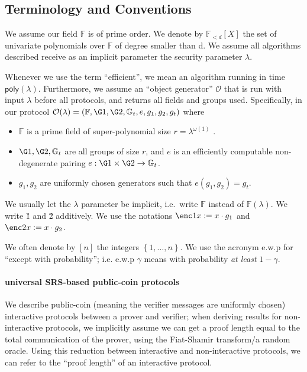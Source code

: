 \documentclass[11pt]{article} %
\newcommand{\Gt}{\ensuremath{{\mathbb G}_t}\xspace}
\newcommand{\F}{\ensuremath{\mathbb F}\xspace}
\newcommand{\defeq}{:=}
\newcommand{\set}[1]{\ensuremath{\left\{#1\right\}}\xspace}
\newcommand{\polysofdeg}[1]{\ensuremath{\F_{< #1}[X]}\xspace}
\newcommand{\obgen}{\ensuremath{\mathcal O}\xspace}
\newcommand{\poly}{\ensuremath{\mathsf{poly(\lambda)}}\xspace}
\begin{document}
\subsection{Terminology and Conventions}\label{sec:terminology}
We assume our field \F is of prime order.
We denote by \polysofdeg{d} the set of univariate polynomials over \F of degree smaller than d. 
We assume all algorithms described receive as an implicit parameter the security parameter $\lambda$.

Whenever we use the term “efficient”, we mean an algorithm running in time \poly. Furthermore,
we assume an “object generator” \obgen that is run with input $\lambda$ before all protocols, and returns all fields and groups used. Specifically, in our protocol $\obgen(\lambda) = (\F, \G1, \G2, \Gt, e, g_1, g_2,g_t)$ where
\begin{itemize}
\item \F is a prime field of super-polynomial size $r = \lambda^{\omega(1)}$
.
\item $\G1,\G2,\Gt$ are all groups of size $r$, and $e$ is an efficiently computable non-degenerate pairing
$e : \G1 \times \G2 \to \Gt$.
\item $g_1,g_2$ are uniformly chosen generators such that $e(g_1, g_2) = g_t$.
\end{itemize}
We usually let the $\lambda$ parameter be implicit, i.e.\ write \F instead of $\F(\lambda)$.
We write \G1 and \G2 additively. We use the notations $\enc1{x}\defeq x\cdot g_1$ and $\enc2{x}\defeq x\cdot g_2$.

We often denote by $[n]$ the integers \set{1,\ldots,n}.
We use the acronym e.w.p for ``except with probability''; i.e. e.w.p $\gamma$ means with probability \emph{at least} $1-\gamma$.

\paragraph{universal SRS-based public-coin protocols}
We describe public-coin (meaning the verifier messages are uniformly chosen) interactive protocols between a prover and verifier; when deriving results for non-interactive protocols, we implicitly assume we can get a proof length equal to the total communication of the prover, using the Fiat-Shamir transform/a random oracle. Using this reduction between interactive and non-interactive protocols, we can refer to the ``proof length'' of an interactive protocol. 
\end{document}
